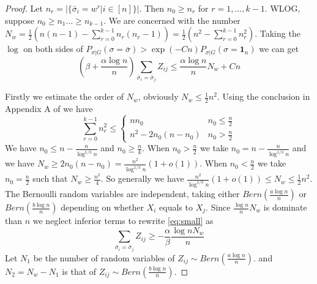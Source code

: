 \documentclass{article}
\begin{document}
\begin{proof}
	Let $n_r = |\{\bar{\sigma}_i = w^r | i\in [n] \}|$. Then $n_0 \geq n_r$ for $r=1, \dots, k-1$.
	WLOG, suppose $n_0 \geq n_1 \dots \geq n_{k-1}$.
	We are concerned with the number $N_w = \frac{1}{2}(n(n-1) - \sum_{r=0}^{k-1} n_r(n_r-1))
	=\frac{1}{2}(n^2 - \sum_{r=0}^{k-1} n_r^2)$.
	Taking the $\log$ on both sides of $P_{\sigma | G}(\sigma = \bar{\sigma} ) > \exp(-Cn) P_{\sigma | G}(\sigma = \mathbf{1}_n)$ we can get
	\begin{equation}\label{eq:small}
	(\beta + \frac{\alpha \log n}{n}) \sum_{\bar{\sigma}_i  = \bar{\sigma}_j} Z_{ij} \leq \frac{\alpha \log n}{n} N_w + C n
	\end{equation}
	
	Firstly we estimate the order of $N_w$, obviously $N_w \leq \frac{1}{2} n^2$.
	Using the conclusion in Appendix A of \cite{yixin} we have
	\begin{equation}
	\sum_{r=0}^{k-1} n_r^2 \leq
	\begin{cases}
	n n_0 & n_0 \leq \frac{n}{2} \\
	n^2 - 2n_0(n-n_0) & n_0 > \frac{n}{2}
	\end{cases}
	\end{equation}
	We have $n_0 \leq n - \frac{n}{\log^{1/3} n}$ and $n_0 \geq \frac{n}{k}$. When $n_0 > \frac{n}{2}$ we take $n_0 = n - \frac{n}{\log^{1/3} n}$
	and we have $N_w \geq 2n_0 (n - n_0) = \frac{n^2}{\log^{1/3} n}(1+o(1))$. When $n_0 < \frac{n}{2}$ we take $n_0 = \frac{n}{2}$ such that
	$N_w \geq \frac{n^2}{4}$. So generally we have $\frac{n^2}{\log^{1/3} n}(1+o(1)) \leq N_w \leq \frac{1}{2}n^2$.
	The Bernoulli random variables are independent, taking either $Bern(\frac{a\log n}{n})$ or $Bern(\frac{b \log n}{n})$ depending on whether
	$X_i$ equals to $X_j$.
	Since $\frac{\log n}{n} N_w$ is dominate than $n$ we neglect inferior terms to rewrite \eqref{eq:small} as
	\begin{equation}
		\sum_{ \bar{\sigma}_i  = \bar{\sigma}_j } Z_{ij} \geq -\frac{\alpha}{\beta}\frac{\log n N_w}{n}
	\end{equation}
	Let $N_1$ be the number of random variables of $Z_{ij} \sim Bern(\frac{a\log n}{n})$.
	and $N_2 = N_w - N_1$ is that of $Z_{ij} \sim Bern(\frac{b\log n}{n})$.
	

\end{proof}
\end{document}
